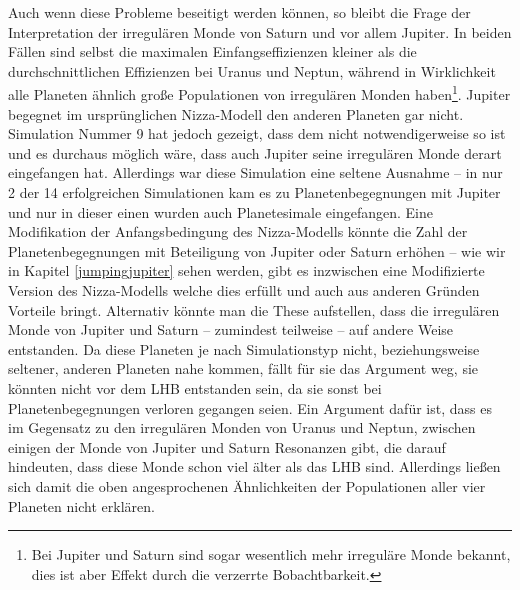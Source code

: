 \documentclass[12pt,a4paper,twoside]{article}
\renewcommand{\cite}{\citep}
\begin{document}
Auch wenn diese Probleme beseitigt werden können, so bleibt die Frage der Interpretation der irregulären Monde von Saturn und vor allem Jupiter. In beiden Fällen sind selbst die maximalen Einfangseffizienzen kleiner als die durchschnittlichen Effizienzen bei Uranus und Neptun,
während in Wirklichkeit alle Planeten ähnlich große Populationen von irregulären Monden haben\footnote{Bei Jupiter und Saturn sind sogar wesentlich mehr irreguläre Monde bekannt, dies ist aber Effekt durch die verzerrte Bobachtbarkeit.}\cite{Nesvorny2007}. %
Jupiter begegnet im ursprünglichen Nizza-Modell den anderen Planeten gar nicht.
Simulation Nummer 9 hat jedoch gezeigt, dass dem nicht notwendigerweise so ist und es durchaus möglich wäre, dass auch Jupiter seine irregulären Monde derart eingefangen hat.
Allerdings war diese Simulation eine seltene Ausnahme – in nur 2 der 14 erfolgreichen Simulationen kam es zu Planetenbegegnungen mit Jupiter und nur in dieser einen wurden auch Planetesimale eingefangen.
Eine Modifikation der Anfangsbedingung des Nizza-Modells könnte die Zahl der Planetenbegegnungen mit Beteiligung von Jupiter oder Saturn erhöhen -- wie wir in Kapitel \ref{jumpingjupiter} sehen werden, gibt es inzwischen eine Modifizierte Version des Nizza-Modells welche dies erfüllt und auch aus anderen Gründen Vorteile bringt.
Alternativ könnte man die These aufstellen, dass die irregulären Monde von Jupiter und Saturn – zumindest teilweise – auf andere Weise entstanden. Da diese Planeten je nach Simulationstyp nicht, beziehungsweise seltener, anderen Planeten nahe kommen, fällt für sie das Argument weg, sie könnten nicht vor dem LHB entstanden sein, da sie sonst bei Planetenbegegnungen verloren gegangen seien.
Ein Argument dafür ist, dass es im Gegensatz zu den irregulären Monden von Uranus und Neptun, zwischen einigen der Monde von Jupiter und Saturn Resonanzen gibt, die darauf hindeuten, dass diese Monde schon viel älter als das LHB sind\cite{Beauge2007,Nesvorny2007}.
Allerdings ließen sich damit die oben angesprochenen Ähnlichkeiten der Populationen aller vier Planeten nicht erklären.

\FloatBarrier
\end{document}
